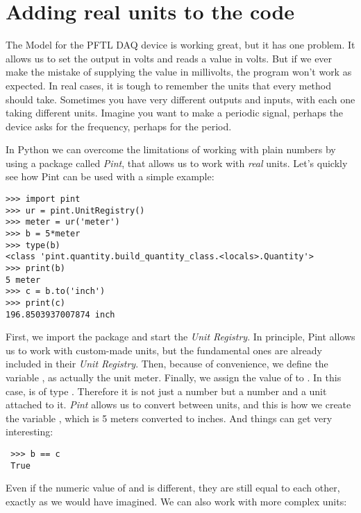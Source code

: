 
\section{Adding real units to the code}\label{sec:pint}
The Model for the {PFTL DAQ} device is working great, but it has one problem. It allows us to set the output in volts and reads a value in volts. But if we ever make the mistake of supplying the value in millivolts, the program won't work as expected. In real cases, it is tough to remember the units that every method should take. Sometimes you have very different outputs and inputs, with each one taking different units. Imagine you want to make a periodic signal, perhaps the device asks for the frequency, perhaps for the period.

In Python we can overcome the limitations of working with plain numbers by using a package called \emph{Pint}, that allows us to work with \emph{real} units. Let's quickly see how Pint can be used with a simple example:

\begin{verbatim}
>>> import pint
>>> ur = pint.UnitRegistry()
>>> meter = ur('meter')
>>> b = 5*meter
>>> type(b)
<class 'pint.quantity.build_quantity_class.<locals>.Quantity'>
>>> print(b)
5 meter
>>> c = b.to('inch')
>>> print(c)
196.8503937007874 inch
\end{verbatim}

First, we import the package and start the \emph{Unit Registry}. In principle, Pint allows us to work with custom-made units, but the fundamental ones are already included in their \emph{Unit Registry}. Then, because of convenience, we define the variable , as actually the unit meter. Finally, we assign the value of  to . In this case,  is of type . Therefore it is not just a number but a number and a unit attached to it. \emph{Pint} allows us to convert between units, and this is how we create the variable , which is 5 meters converted to inches. And things can get very interesting:

\begin{verbatim}
 >>> b == c
 True
\end{verbatim}

Even if the numeric value of  and  is different, they are still equal to each other, exactly as we would have imagined. We can also work with more complex units:

